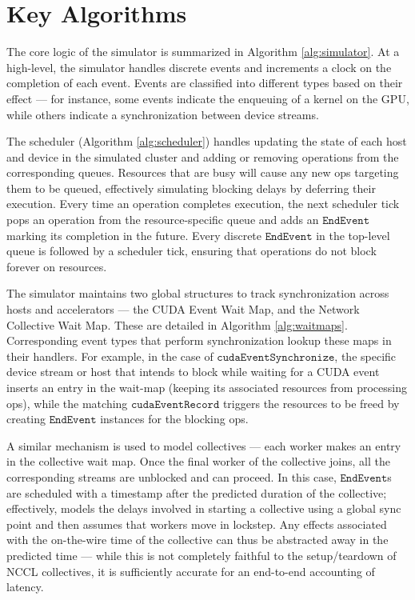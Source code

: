 \appendix

\section{Key Algorithms}
\label{appendix:simulator_core}

The core logic of the simulator is summarized in Algorithm \ref{alg:simulator}. At a high-level, the simulator handles discrete events and increments a clock on the completion of each event. Events are classified into different types based on their effect --- for instance, some events indicate the enqueuing of a kernel on the GPU, while others indicate a synchronization between device streams.

The scheduler (Algorithm \ref{alg:scheduler}) handles updating the state of each host and device in the simulated cluster and adding or removing operations from the corresponding queues. Resources that are busy will cause any new ops targeting them to be queued, effectively simulating blocking delays by deferring their execution. Every time an operation completes execution, the next scheduler tick pops an operation from the resource-specific queue and adds an $\texttt{EndEvent}$ marking its completion in the future. Every discrete $\texttt{EndEvent}$ in the top-level queue is followed by a scheduler tick, ensuring that operations do not block forever on resources.



\vfill\break
The simulator maintains two global structures to track synchronization across hosts and accelerators --- the CUDA Event Wait Map, and the Network Collective Wait Map. These are detailed in Algorithm \ref{alg:waitmaps}. Corresponding event types that perform synchronization lookup these maps in their handlers. For example, in the case of $\texttt{cudaEventSynchronize}$, the specific device stream or host that intends to block while waiting for a CUDA event inserts an entry in the wait-map (keeping its associated resources from processing ops), while the matching $\texttt{cudaEventRecord}$ triggers the resources to be freed by creating $\texttt{EndEvent}$ instances for the blocking ops.

A similar mechanism is used to model collectives --- each worker makes an entry in the collective wait map. Once the final worker of the collective joins, all the corresponding streams are unblocked and can proceed. In this case, $\texttt{EndEvent}$s are scheduled with a timestamp after the predicted duration of the collective; effectively, \sysname models the delays involved in starting a collective using a global sync point and then assumes that workers move in lockstep. Any effects associated with the on-the-wire time of the collective can thus be abstracted away in the predicted time --- while this is not completely faithful to the setup/teardown of NCCL collectives, it is sufficiently accurate for an end-to-end accounting of latency.


